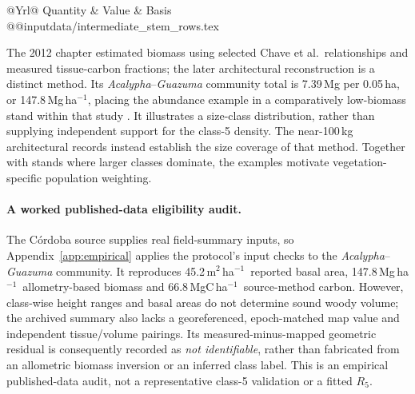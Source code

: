 \documentclass[11pt,a4paper]{article}
\theoremstyle{remark}
\begin{document}
\begin{table}[htbp]
\centering\small
\caption{A published intermediate-stem example: the \textit{Acalypha} sp.--\textit{Guazuma ulmifolia} community in C\'ordoba \citep[Table~170, p.~942]{Vasquez2012}. Class II is 10--30\,cm DBH in the table. Inputs and percentage shares are source-reported; means per stem are derived from the displayed aggregates. The chapter's abstract gives a different lower-class interval, so the table's explicit bin definition is used here.}
\label{tab:intermediate}
\begin{tabularx}{\textwidth}{@{}Yrl@{}}
\toprule
Quantity & Value & Basis\\
\midrule
\csname @@input\endcsname data/intermediate_stem_rows.tex
\bottomrule
\end{tabularx}
\end{table}

The 2012 chapter estimated biomass using selected Chave et al.\ relationships and measured tissue-carbon fractions; the later architectural reconstruction is a distinct method. Its \textit{Acalypha}--\textit{Guazuma} community total is 7.39\,Mg per 0.05\,ha, or 147.8\,Mg\,ha$^{-1}$, placing the abundance example in a comparatively low-biomass stand within that study \citep[Table~170, p.~942]{Vasquez2012}. It illustrates a size-class distribution, rather than supplying independent support for the class-5 density. The near-100\,kg architectural records instead establish the size coverage of that method. Together with stands where larger classes dominate, the examples motivate vegetation-specific population weighting.

\paragraph{A worked published-data eligibility audit.}
The C\'ordoba source supplies real field-summary inputs, so Appendix~\ref{app:empirical} applies the protocol's input checks to the \textit{Acalypha}--\textit{Guazuma} community. It reproduces 45.2\,m$^2$\,ha$^{-1}$\ reported basal area, 147.8\,Mg\,ha$^{-1}$\ allometry-based biomass and 66.8\,MgC\,ha$^{-1}$\ source-method carbon. However, class-wise height ranges and basal areas do not determine sound woody volume; the archived summary also lacks a georeferenced, epoch-matched map value and independent tissue/volume pairings. Its measured-minus-mapped geometric residual is consequently recorded as \emph{not identifiable}, rather than fabricated from an allometric biomass inversion or an inferred class label. This is an empirical published-data audit, not a representative class-5 validation or a fitted $R_5$.
\end{document}
